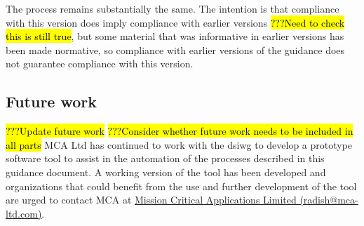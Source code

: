 The process remains substantially the same. The intention is that compliance with this version does imply compliance with earlier versions \hl{???Need to check this is still true}, but some material that was informative in earlier versions has been made normative, so compliance with earlier versions of the guidance does not guarantee compliance with this version.\cbend\
\subsection*{Future work}
\hl{???Update future work}
\hl{???Consider whether future work needs to be included in all parts}
MCA Ltd has continued to work with the \gls{dsiwg} to develop a prototype software tool to assist in the automation of the processes described in this guidance document.
A working version of the tool has been developed and organizations that could benefit from the use and further development of the tool are urged to contact MCA at \href{mailto:radish@mca-ltd.com}{Mission Critical Applications Limited (radish@mca-ltd.com)}.

